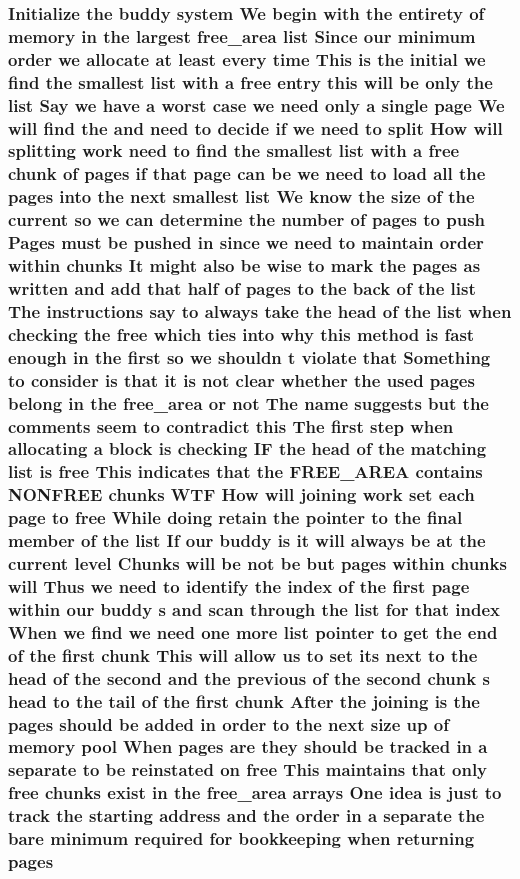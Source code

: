 \subsubsection[{\texorpdfstring{pages}{pages}}]{\setlength{\rightskip}{0pt plus 5cm}Initialize the buddy system We begin with the entirety of memory {\bf in} the largest {\bf free\+\_\+area} {\bf list} Since our minimum {\bf order} we allocate at least every time This {\bf is} the initial we find the smallest {\bf list} with a free entry this will be only the {\bf list} Say we have a worst case we need only a single {\bf page} We will find the and need to decide if we need to {\bf split} How will splitting work need to find the smallest {\bf list} with a free {\bf chunk} of pages if that {\bf page} can be we need to load all the pages into the next smallest {\bf list} We know the size of the current {\bf so} we can determine the number of pages to push Pages must be pushed {\bf in} since we need to maintain {\bf order} within chunks It might also be wise to mark the pages as written and add that half of pages to the back of the {\bf list} The instructions say to always take the head of the {\bf list} when checking the free which ties into why this method {\bf is} fast enough {\bf in} the {\bf first} {\bf so} we shouldn t violate that Something to consider {\bf is} that {\bf it} {\bf is} {\bf not} clear whether the used pages belong {\bf in} the {\bf free\+\_\+area} or {\bf not} The name suggests but the comments seem to contradict this The {\bf first} step when allocating a block {\bf is} checking IF the head of the matching {\bf list} {\bf is} free This indicates that the F\+R\+E\+E\+\_\+\+A\+R\+EA contains N\+O\+N\+F\+R\+EE chunks W\+TF How will joining work set each {\bf page} to free While doing retain the pointer to the final member of the {\bf list} If our buddy {\bf is} {\bf it} will always be at the current level Chunks will be {\bf not} be but pages within chunks will Thus we need to identify the index of the {\bf first} {\bf page} within our buddy s and scan through the {\bf list} for that index When we find we need one more {\bf list} pointer to get the end of the {\bf first} {\bf chunk} This will allow us to set its next to the head of the second and the previous of the second {\bf chunk} s head to the tail of the {\bf first} {\bf chunk} After the joining {\bf is} the pages should be added {\bf in} {\bf order} to the next size up of memory pool When pages are they should be tracked {\bf in} a separate to be reinstated on free This maintains that only free chunks exist {\bf in} the {\bf free\+\_\+area} arrays One idea {\bf is} just to track the starting address and the {\bf order} {\bf in} a separate the bare minimum required for bookkeeping when returning pages}\hypertarget{notes_8txt_a591847dfa4e8c250a8c08a63e5063001}{}\label{notes_8txt_a591847dfa4e8c250a8c08a63e5063001}


